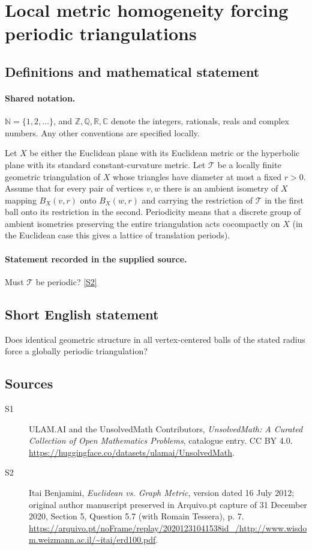 \documentclass[11pt]{article}
\newcommand{\sref}[2]{\hyperlink{source:#1:#2}{[S#2]}}
\begin{document}
\section{Local metric homogeneity forcing periodic triangulations}\label{statement}

\subsection{Definitions and mathematical statement}

\paragraph{Shared notation.}$\mathbb N=\{1,2,\ldots\}$, and $\mathbb Z,\mathbb Q,\mathbb R,\mathbb C$ denote the integers, rationals, reals and complex numbers. Any other conventions are specified locally.


Let $X$ be either the Euclidean plane with its Euclidean metric or the hyperbolic plane with its standard constant-curvature metric. Let $\mathcal T$ be a locally finite geometric triangulation of $X$ whose triangles have diameter at most a fixed $r>0$. Assume that for every pair of vertices $v,w$ there is an ambient isometry of $X$ mapping $B_X(v,r)$ onto $B_X(w,r)$ and carrying the restriction of $\mathcal T$ in the first ball onto its restriction in the second. Periodicity means that a discrete group of ambient isometries preserving the entire triangulation acts cocompactly on $X$ (in the Euclidean case this gives a lattice of translation periods).
\paragraph{Statement recorded in the supplied source.}
Must $\mathcal T$ be periodic? \sref{statement}{2}
\subsection{Short English statement}
Does identical geometric structure in all vertex-centered balls of the stated radius force a globally periodic triangulation?
\subsection{Sources}
\begin{description}
\item[\hypertarget{source:statement:1}{S1}] ULAM.AI and the UnsolvedMath Contributors, \emph{UnsolvedMath: A Curated Collection of Open Mathematics Problems}, catalogue entry. CC BY 4.0. \url{https://huggingface.co/datasets/ulamai/UnsolvedMath}.
\item[\hypertarget{source:statement:2}{S2}] Itai Benjamini, \emph{Euclidean vs. Graph Metric}, version dated 16 July 2012; original author manuscript preserved in Arquivo.pt capture of 31 December 2020, Section 5, Question 5.7 (with Romain Tessera), p. 7. \url{https://arquivo.pt/noFrame/replay/20201231041538id_/http://www.wisdom.weizmann.ac.il/~itai/erd100.pdf}.
\end{description}
\label{end:statement}
\end{document}
